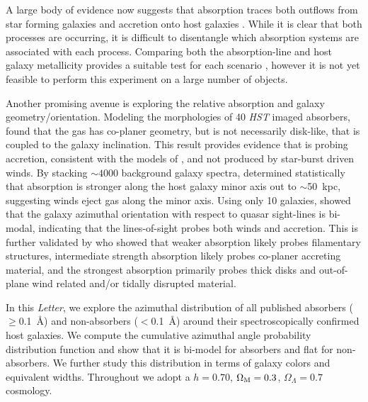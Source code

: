 \documentclass{emulateapj}
\begin{document}
A large body of evidence now suggests that {\MgII} absorption traces
both outflows from star forming galaxies
\citep{bouche06,tremonti07,zibetti07,martin09,weiner09,chelouche10,nestor11,noterdaeme10,bordoloi11,coil11,rubin10,menard12}
and accretion onto host galaxies
\citep{steidel02,chen10a,chen10b,kacprzak10a,kacprzak11b,stewart11b,ribaudo11,kacprzak12,rubin12}.
While it is clear that both processes are occurring, it is difficult
to disentangle which absorption systems are associated with each
process.  Comparing both the absorption-line and host galaxy
metallicity provides a suitable test for each scenario
\citep[e.g.,][and references therein]{ribaudo11,kacprzak12}, however
it is not yet feasible to perform this experiment on a large number of
objects.

Another promising avenue is exploring the relative {\MgII} absorption
and galaxy geometry/orientation. Modeling the morphologies of 40 {\it
HST} imaged absorbers, \citet{kacprzak11b} found that the {\MgII} gas
has co-planer geometry, but is not necessarily disk-like, that is
coupled to the galaxy inclination. This result provides evidence that
{\MgII} is probing accretion, consistent with the models of
\citet{stewart11b}, and not produced by star-burst driven winds.  By
stacking $\sim4000$ background galaxy spectra, \citet{bordoloi11}
determined statistically that {\MgII} absorption is stronger along the
host galaxy minor axis out to $\sim$50~kpc, suggesting winds eject gas
along the minor axis.  Using only 10 galaxies, \citet{bouche11} showed
that the galaxy azimuthal orientation with respect to quasar
sight-lines is bi-modal, indicating that the lines-of-sight probes
both winds and accretion. This is further validated by
\citet{churchill12a} who showed that weaker {\MgII} absorption likely
probes filamentary structures, intermediate strength {\MgII}
absorption likely probes co-planer accreting material, and the
strongest absorption primarily probes thick disks and out-of-plane
wind related and/or tidally disrupted material.

In this {\it Letter}, we explore the azimuthal distribution of all
published {\MgII} absorbers ($\geq$0.1~\AA) and non-absorbers
($<$0.1~\AA) around their spectroscopically confirmed host galaxies.
We compute the cumulative azimuthal angle probability distribution
function and show that it is bi-model for absorbers and flat for
non-absorbers. We further study this distribution in terms of galaxy
colors and equivalent widths. Throughout we adopt a $h=0.70$,
$\Omega_{\rm M}=0.3$, $\Omega_{\Lambda}=0.7$ cosmology.
\end{document}
